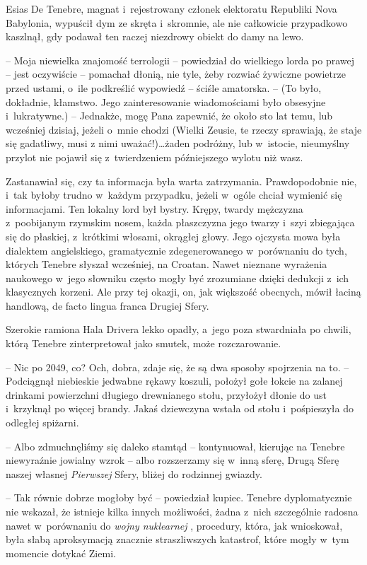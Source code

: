 \documentclass[oneside,polish,12pt,sfheadings]{mwbk}
\begin{document}
Esias De Tenebre, magnat i~rejestrowany członek elektoratu Republiki
Nova Babylonia, wypuścił dym ze skręta i~skromnie, ale nie całkowicie
przypadkowo kaszlnął, gdy podawał ten raczej niezdrowy obiekt do damy na
lewo.

-- Moja niewielka znajomość terrologii -- powiedział do wielkiego lorda po
prawej -- jest oczywiście -- pomachał dłonią, nie tyle, żeby rozwiać
żywiczne powietrze przed ustami, o~ile podkreślić wypowiedź -- ściśle
amatorska. -- (To było, dokładnie, kłamstwo. Jego zainteresowanie
wiadomościami było obsesyjne i~lukratywne.) -- Jednakże, mogę Pana
zapewnić, że około sto lat temu, lub wcześniej dzisiaj, jeżeli o~mnie
chodzi (Wielki Zeusie, te rzeczy sprawiają, że staje się gadatliwy, musi
z nimi uważać!)\ldots żaden podróżny, lub w~istocie, nieumyślny przylot
nie pojawił się z~twierdzeniem późniejszego wylotu niż wasz.

Zastanawiał się, czy ta informacja była warta zatrzymania.
Prawdopodobnie nie, i~tak byłoby trudno w~każdym przypadku, jeżeli w~ogóle chciał wymienić się informacjami. Ten lokalny lord był bystry.
Krępy, twardy mężczyzna z~poobijanym rzymskim nosem, każda płaszczyzna
jego twarzy i~szyi zbiegająca się do płaskiej, z~krótkimi włosami,
okrągłej głowy. Jego ojczysta mowa była dialektem angielskiego,
gramatycznie zdegenerowanego w~porównaniu do tych, których Tenebre
słyszał wcześniej, na Croatan. Nawet nieznane wyrażenia naukowego w~jego
słowniku często mogły być zrozumiane dzięki dedukcji z~ich klasycznych
korzeni. Ale przy tej okazji, on, jak większość obecnych, mówił łaciną
handlową, de facto lingua franca Drugiej Sfery.

Szerokie ramiona Hala Drivera lekko opadły, a~jego poza stwardniała po
chwili, którą Tenebre zinterpretował jako smutek, może rozczarowanie.

-- Nic po 2049, co? Och, dobra, zdaje się, że są dwa sposoby spojrzenia
na to. -- Podciągnął niebieskie jedwabne rękawy koszuli, położył gołe
łokcie na zalanej drinkami powierzchni długiego drewnianego stołu,
przyłożył dłonie do ust i~krzyknął po więcej brandy. Jakaś dziewczyna
wstała od stołu i~pośpieszyła do odległej spiżarni.

-- Albo zdmuchnęliśmy się daleko stamtąd -- kontynuował, kierując na
Tenebre niewyraźnie jowialny wzrok -- albo rozszerzamy się w~inną sferę,
Drugą Sferę naszej własnej \emph{Pierwszej }Sfery, bliżej do rodzinnej
gwiazdy.

-- Tak równie dobrze mogłoby być -- powiedział kupiec. Tenebre
dyplomatycznie nie wskazał, że istnieje kilka innych możliwości, żadna z~nich szczególnie radosna nawet w~porównaniu do \emph{wojny nuklearnej },
procedury, która, jak wnioskował, była słabą aproksymacją znacznie
straszliwszych katastrof, które mogły w~tym momencie dotykać Ziemi.
\end{document}
